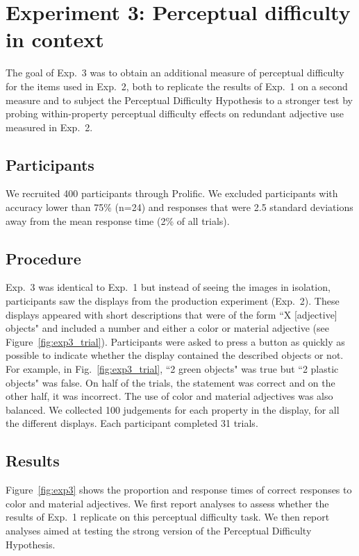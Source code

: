 \documentclass[12pt,letterpaper]{article}
\begin{document}
\section{Experiment 3: Perceptual difficulty in context} 

The goal of Exp.~3 was to obtain an additional measure of perceptual difficulty for the items used in Exp.~2, both to replicate the results of Exp.~1 on a second measure and to subject the Perceptual Difficulty Hypothesis to a stronger test by probing within-property perceptual difficulty effects on redundant adjective use measured in Exp.~2.

\subsection{Participants} 

We recruited 400 participants through Prolific. We excluded participants with accuracy lower than 75\% (n=24) and responses that were 2.5 standard deviations away from the mean response time (2\% of all trials).
\subsection{Procedure} 

Exp.~3 was identical to Exp.~1 but instead of seeing the images in isolation, participants saw the displays from the production experiment (Exp.~2). These displays appeared with short descriptions that were of the form ``X [adjective] objects" and included a number and either a color or material adjective (see Figure~\ref{fig:exp3_trial}). Participants were asked to press a button as quickly as possible to indicate whether the display contained the described objects or not. For example, in Fig.~\ref{fig:exp3_trial}, ``2 green objects" was true but ``2 plastic objects" was false. On half of the trials, the statement was correct and on the other half, it was incorrect. The use of color and material adjectives was also balanced. We collected 100 judgements for each property in the display, for all the different displays. Each participant completed 31 trials.

\subsection{Results} 

Figure~\ref{fig:exp3} shows the proportion and response times of correct responses to color and material adjectives.  We first report analyses to assess whether the results of Exp.~1 replicate on this perceptual difficulty task. We then report analyses aimed at testing the strong version of the Perceptual Difficulty Hypothesis.
\end{document}
